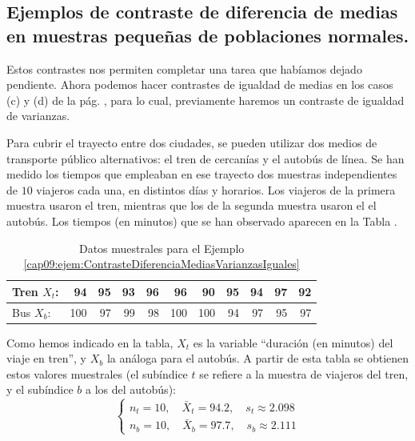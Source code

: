 \subsection{Ejemplos de contraste de diferencia de medias en muestras pequeñas de poblaciones normales.}
\label{cap09:subsec:EjemplosContrasteDiferenciaMediasUsandoT}

Estos contrastes nos permiten completar una tarea que habíamos dejado pendiente. Ahora podemos hacer contrastes de igualdad de medias en los casos (c) y (d) de la pág. \pageref{cap09:lugar:ContrasteDiferenciaMediasVarianzasIguales}, para lo cual,
previamente haremos un contraste de igualdad de varianzas.



\begin{ejemplo}
\label{cap09:ejem:ContrasteDiferenciaMediasVarianzasIguales}
Para cubrir el trayecto entre dos ciudades, se pueden utilizar dos medios de transporte público alternativos: el tren de cercanías y el autobús de línea. Se han medido los tiempos que empleaban en ese trayecto dos muestras independientes de $10$ viajeros cada una, en distintos días y horarios. Los viajeros de la primera muestra usaron el tren, mientras que los de la segunda muestra usaron el el autobús. Los tiempos (en minutos) que se han observado aparecen en la Tabla .
\begin{table}[ht]
\centering
\begin{tabular}{|l|rrrrrrrrrr|}
  \hline
  Tren $X_t$: & 94 & 95 & 93 & 96 & 96 & 90 & 95 & 94 & 97 & 92 \\
  \hline
  Bus $X_b$: & 100 & 97 & 99 & 98 & 100 & 100 & 94 & 97 & 95 & 97 \\
   \hline
\end{tabular}
\caption{Datos muestrales para el Ejemplo \ref{cap09:ejem:ContrasteDiferenciaMediasVarianzasIguales}}
\label{cap09:tabla:ejemploContrasteDiferneciaMediasVarianzasIguales}
\end{table}

Como hemos indicado en la tabla, $X_t$ es la variable ``duración (en minutos) del viaje en tren'', y $X_b$ la análoga para el autobús. A partir de esta tabla se obtienen estos valores muestrales (el subíndice $t$ se refiere a la muestra de viajeros del tren, y el subíndice $b$ a los del autobús):
\[
\begin{cases}
n_t=10,\quad \bar X_t=94.2,\quad s_t\approx 2.098\\[3mm]
n_b=10,\quad \bar X_b=97.7,\quad s_b\approx 2.111
\end{cases}
\]


\end{ejemplo}
